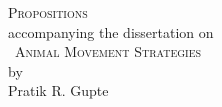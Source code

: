 \begingroup

\clearpage

\begin{onehalfspace}
    \begin{center}
        {\LARGE \scshape{Propositions}} \\
        {\small accompanying the dissertation on}\\
        {\large \adftripleflourishleft~\scshape{Animal Movement Strategies}~\adftripleflourishright}\\
        by\\
        Pratik R. Gupte
    \end{center}
\end{onehalfspace}

\raggedright

